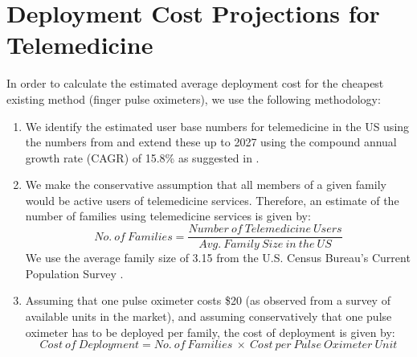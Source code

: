 %
%

\chapter{Deployment Cost Projections for Telemedicine}
\label{chap:telemedicine_cost_projections}

In order to calculate the estimated average deployment cost for the cheapest existing method (finger pulse oximeters), we use the following methodology:
\begin{enumerate}
    \item We identify the estimated user base numbers for telemedicine in the US using the numbers from \cite{kats_us_2020} and extend these up to 2027 using the compound annual growth rate (CAGR) of 15.8\% as suggested in \cite{polaris_us_2020}.
    
    \item We make the conservative assumption that all members of a given family would be active users of telemedicine services. Therefore, an estimate of the number of families using telemedicine services is given by: 
    \begin{equation}
        No.~of~Families = \frac{Number~of~Telemedicine~Users}{Avg.~Family~Size~in~the~US}
    \end{equation}
    We use the average family size of 3.15 from the U.S. Census Bureau's Current Population Survey \cite{cps_us_2020}.
    
    \item Assuming that one pulse oximeter costs \$20 (as observed from a survey of available units in the market), and assuming conservatively that one pulse oximeter has to be deployed per family, the cost of deployment is given by: 
    \begin{equation}
        Cost~of~Deployment = No.~of~Families~\times~Cost~per~Pulse~Oximeter~Unit
    \end{equation}
\end{enumerate}





